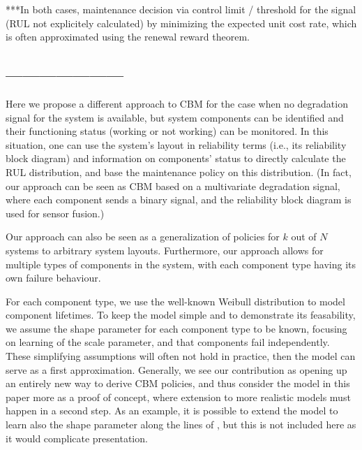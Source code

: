 \documentclass[authoryear]{elsarticle}
\begin{document}
***In both cases, maintenance decision via control limit / threshold for the signal
(RUL not explicitely calculated)
by minimizing the expected unit cost rate,
which is often approximated using the renewal reward theorem.

\subsection*{---------------------}

Here we propose a different approach to CBM
for the case when no degradation signal for the system is available,
but system components can be identified and their functioning status
(working or not working) can be monitored.
In this situation, one can use the system's layout in reliability terms
(i.e., its reliability block diagram) and information on components' status
to directly calculate the RUL distribution,
and base the maintenance policy on this distribution.
(In fact, our approach can be seen as CBM based on a multivariate degradation signal,
where each component sends a binary signal, and the reliability block diagram is used
for sensor fusion.)

Our approach can also be seen as a generalization of policies for $k$ out of $N$ systems to arbitrary system layouts.
Furthermore, our approach allows for multiple types of components in the system,
with each component type having its own failure behaviour.

For each component type, we use the well-known Weibull distribution to model component lifetimes.
To keep the model simple and to demonstrate its feasability, we assume the shape parameter for each component type to be known,
focusing on learning of the scale parameter,
and that components fail independently.
These simplifying assumptions will often not hold in practice,
then the model can serve as a first approximation.
Generally, we see our contribution as opening up an entirely new way to derive CBM policies,
and thus consider the model in this paper more as a proof of concept,
where extension to more realistic models must happen in a second step.
As an example, it is possible to extend the model to learn also the shape parameter along the lines of
\cite{1969:soland},
but this is not included here as it would complicate presentation.
\end{document}
